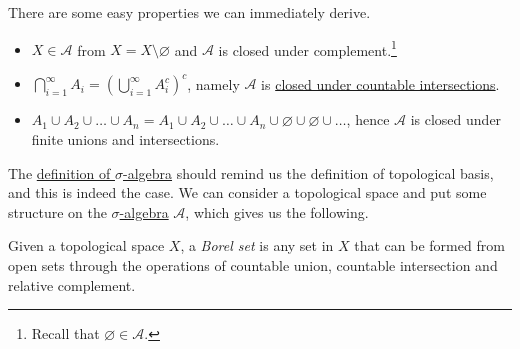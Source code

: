 \begin{remark}
	There are some easy properties we can immediately derive.
	\begin{itemize}
		\item \(X\in \mathcal{A} \) from \(X = X\setminus \varnothing \) and \(\mathcal{A}\) is closed under complement.\footnote{Recall that \(\varnothing \in \mathcal{A} \).}
		\item \(\bigcap_{i=1}^{\infty} A_{i} = \left(\bigcup_{i=1}^{\infty} A_{i}^{c} \right)^c\), namely \(\mathcal{A} \) is \underline{closed under countable intersections}.
		\item \(A_1\cup A_2 \cup \dots \cup A_n = A_1\cup A_2 \cup \dots \cup A_n \cup \varnothing \cup \varnothing \cup\dots\), hence \(\mathcal{A} \) is closed under finite unions and intersections.
	\end{itemize}
\end{remark}

\begin{note}
	The \hyperref[def:sigma-algebra]{definition of \(\sigma\)-algebra} should remind us the definition of topological basis, and this is indeed the case. We can consider a topological space and put some structure on the \hyperref[def:sigma-algebra]{\(\sigma\)-algebra} \(\mathcal{A} \), which gives us the following.
\end{note}

\begin{definition}\label{def:Borel-set}
	Given a topological space \(X\), a \emph{Borel set} is any set in \(X\) that can be formed from open sets through the operations of countable union, countable intersection and relative complement.
\end{definition}